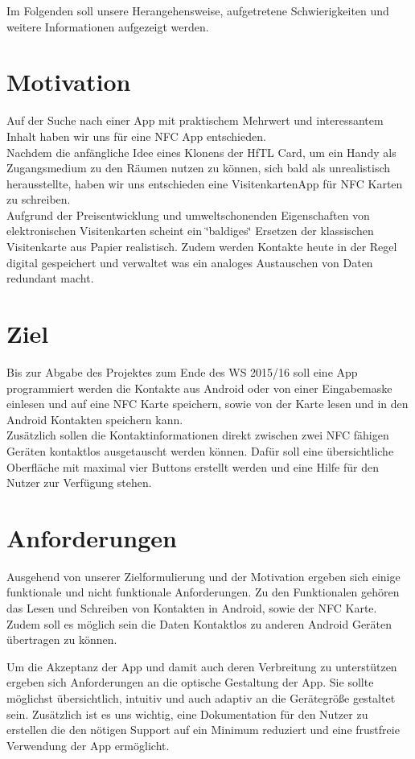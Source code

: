 \documentclass[a4paper,ngerman,12pt]{scrreprt}
\begin{document}
Im Folgenden soll unsere Herangehensweise, aufgetretene Schwierigkeiten und weitere Informationen aufgezeigt werden.

\section{Motivation}

Auf der Suche nach einer App mit praktischem Mehrwert und interessantem Inhalt haben wir uns für eine NFC App entschieden. \\
Nachdem die anfängliche Idee eines Klonens der HfTL Card, um ein Handy als Zugangsmedium zu den Räumen nutzen zu können, sich bald als unrealistisch herausstellte, haben wir uns entschieden eine VisitenkartenApp für NFC Karten zu schreiben. \\
Aufgrund der Preisentwicklung und umweltschonenden Eigenschaften von elektronischen Visitenkarten scheint ein \char`\"{}baldiges\char`\"{} Ersetzen der klassischen Visitenkarte aus Papier realistisch. Zudem werden Kontakte heute in der Regel digital gespeichert und verwaltet was ein analoges Austauschen von Daten redundant macht.

\section{Ziel}
Bis zur Abgabe des Projektes zum Ende des WS 2015/16 soll eine App programmiert werden die Kontakte aus Android oder von einer Eingabemaske einlesen und auf eine NFC Karte speichern, sowie von der Karte lesen und in den Android Kontakten speichern kann. \\
Zusätzlich sollen die Kontaktinformationen direkt zwischen zwei NFC fähigen Geräten kontaktlos ausgetauscht werden können. Dafür soll eine übersichtliche Oberfläche mit maximal vier Buttons erstellt werden und eine Hilfe für den Nutzer zur Verfügung stehen.

\section{Anforderungen}
Ausgehend von unserer Zielformulierung und der Motivation ergeben sich einige funktionale und nicht funktionale Anforderungen.
Zu den Funktionalen gehören das Lesen und Schreiben von Kontakten in Android, sowie der NFC Karte.
Zudem soll es möglich sein die Daten Kontaktlos zu anderen Android Geräten übertragen zu können.\newline

Um die Akzeptanz der App und damit auch deren Verbreitung zu unterstützen ergeben sich Anforderungen an die optische Gestaltung der App. Sie sollte möglichst übersichtlich, intuitiv und auch adaptiv an die Gerätegröße gestaltet sein. Zusätzlich ist es uns wichtig, eine Dokumentation für den Nutzer zu erstellen die den nötigen Support auf ein Minimum reduziert und eine frustfreie Verwendung der App ermöglicht.
\end{document}

